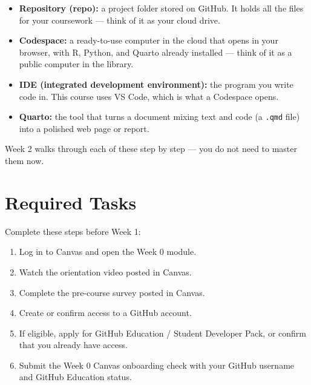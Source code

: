 \documentclass[
  letterpaper,
  DIV=11,
  numbers=noendperiod,
  oneside]{scrreprt}
\providecommand{\tightlist}{%
  \setlength{\itemsep}{0pt}\setlength{\parskip}{0pt}}
\begin{document}
\begin{tcolorbox}[enhanced jigsaw, title=\textcolor{quarto-callout-note-color}{\faInfo}\hspace{0.5em}{Four terms you will see all course}, arc=.35mm, toptitle=1mm, colframe=quarto-callout-note-color-frame, toprule=.15mm, leftrule=.75mm, bottomtitle=1mm, opacityback=0, bottomrule=.15mm, coltitle=black, breakable, opacitybacktitle=0.6, titlerule=0mm, colback=white, left=2mm, colbacktitle=quarto-callout-note-color!10!white, rightrule=.15mm]

\begin{itemize}
\tightlist
\item
  \textbf{Repository (repo):} a project folder stored on GitHub. It
  holds all the files for your coursework --- think of it as your cloud
  drive.
\item
  \textbf{Codespace:} a ready-to-use computer in the cloud that opens in
  your browser, with R, Python, and Quarto already installed --- think
  of it as a public computer in the library.
\item
  \textbf{IDE (integrated development environment):} the program you
  write code in. This course uses VS Code, which is what a Codespace
  opens.
\item
  \textbf{Quarto:} the tool that turns a document mixing text and code
  (a \texttt{.qmd} file) into a polished web page or report.
\end{itemize}

Week 2 walks through each of these step by step --- you do not need to
master them now.

\end{tcolorbox}

\section*{Required Tasks}\label{required-tasks}


Complete these steps before Week 1:

\begin{enumerate}
\def\labelenumi{\arabic{enumi}.}
\tightlist
\item
  Log in to Canvas and open the Week 0 module.
\item
  Watch the orientation video posted in Canvas.
\item
  Complete the pre-course survey posted in Canvas.
\item
  Create or confirm access to a GitHub account.
\item
  If eligible, apply for GitHub Education / Student Developer Pack, or
  confirm that you already have access.
\item
  Submit the Week 0 Canvas onboarding check with your GitHub username
  and GitHub Education status.
\end{enumerate}
\end{document}
